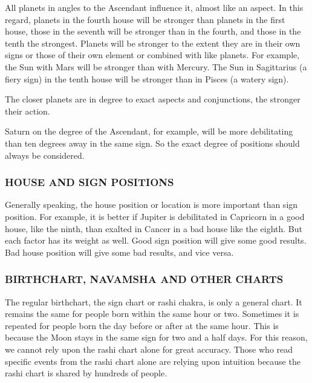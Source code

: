  

All planets in angles to the Ascendant influence it, almost like an aspect. In this regard, planets in the fourth house will be stronger than planets in the first house, those in the seventh will be stronger than in the fourth, and those in the tenth the strongest. Planets will be stronger to the extent they are in their own signs or those of their own element or combined with like planets. For example, the Sun with Mars will be stronger than with Mercury. The Sun in Sagittarius (a fiery sign) in the tenth house will be stronger than in Pisces (a watery sign).

The closer planets are in degree to exact aspects and conjunctions, the stronger their action.
 

Saturn on the degree of the Ascendant, for example, will be more debilitating than ten degrees away in the same sign. So the exact degree of positions should always be considered.

 

\subsubsection{HOUSE AND SIGN POSITIONS}

 

Generally speaking, the house position or location is more important than sign position. For example, it is better if Jupiter is debilitated in Capricorn in a good house, like the ninth, than exalted in Cancer in a bad house like the eighth. But each factor has its weight as well. Good sign position will give some good results. Bad house position will give some bad results, and vice versa.

 

\subsubsection{BIRTHCHART, NAVAMSHA AND OTHER CHARTS}

 

The regular birthchart, the sign chart or rashi chakra, is only a general chart. It remains the same for people born within the same hour or two. Sometimes it is repeated for people born the day before or after at the same hour. This is because the Moon stays in the same sign for two and a half days. For this reason, we cannot rely upon the rashi chart alone for great accuracy. Those who read specific events from the rashi chart alone are relying upon intuition because the rashi chart is shared by hundreds of people.

